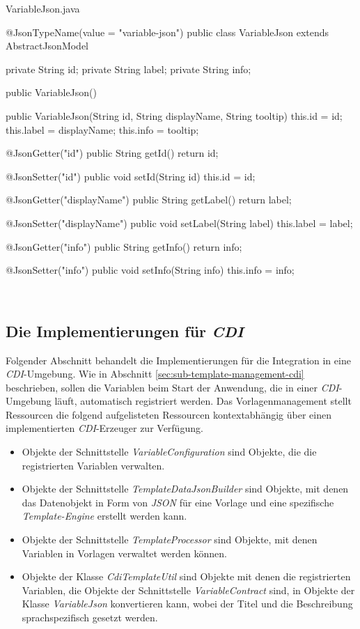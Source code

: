\begin{program}[h]
\caption{VariableJson.java}
\label{prog:variableJson}
\begin{JsCode}
@JsonTypeName(value = "variable-json")
public class VariableJson extends AbstractJsonModel {

    private String id;
    private String label;
    private String info;

    public VariableJson() {
    }

    public VariableJson(String id, String displayName, String tooltip) {
        this.id = id;
        this.label = displayName;
        this.info = tooltip;
    }

    @JsonGetter("id")
    public String getId() { return id; }

    @JsonSetter("id")
    public void setId(String id) { this.id = id; }

    @JsonGetter("displayName")
    public String getLabel() { return label; }

    @JsonSetter("displayName")
    public void setLabel(String label) { this.label = label; }

    @JsonGetter("info")
    public String getInfo() { return info; }

    @JsonSetter("info")
    public void setInfo(String info) { this.info = info; }
}
\end{JsCode}
\end{program}
\ \newpage

\subsection{Die Implementierungen für \emph{CDI}}
\label{sec:sub-impl-integartion-cdi}
Folgender Abschnitt behandelt die Implementierungen für die Integration in eine \emph{CDI}-Umgebung. Wie in Abschnitt \ref{sec:sub-template-management-cdi} beschrieben, sollen die Variablen beim Start der Anwendung, die in einer \emph{CDI}-Umgebung läuft, automatisch  registriert werden. Das Vorlagenmanagement stellt Ressourcen die folgend aufgelisteten Ressourcen kontextabhängig über einen implementierten \emph{CDI}-Erzeuger zur Verfügung. 
\begin{itemize}
 \item Objekte der Schnittstelle \emph{VariableConfiguration} sind Objekte, die die registrierten Variablen verwalten.
 \item Objekte der Schnittstelle \emph{TemplateDataJsonBuilder} sind Objekte, mit denen das Datenobjekt in Form von \emph{JSON} für eine Vorlage und eine spezifische \emph{Template-Engine} erstellt werden kann.
 \item Objekte der Schnittstelle \emph{TemplateProcessor} sind Objekte, mit denen Variablen in Vorlagen verwaltet werden können.
 \item Objekte der Klasse \emph{CdiTemplateUtil} sind Objekte mit denen die registrierten Variablen, die Objekte der Schnittstelle \emph{VariableContract} sind, in Objekte der Klasse \emph{VariableJson} konvertieren kann, wobei der Titel und die Beschreibung sprachspezifisch gesetzt werden.
\end{itemize}

